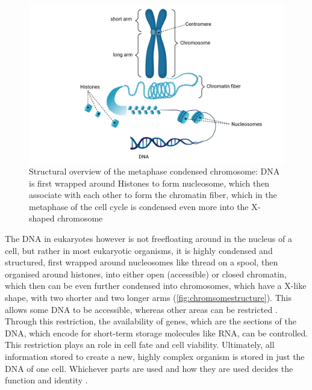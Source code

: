 \begin{figure}[!ht]
\centering
\includegraphics[width=0.9\linewidth]{Figures/intro/ChromosomeStructure}
\caption[Overview Chromosome structure]{Structural overview of the metaphase condensed chromosome: DNA is first wrapped around Histones to form nucleosome, which then associate with each other to form the chromatin fiber, which in the metaphase of the cell cycle is condensed even more into the X-shaped chromosome}\label{fig:chromsomestructure}
\end{figure}

The DNA in eukaryotes\add{,} however is not free\add{-}floating around in the nucleus of a cell, but rather in most eukaryotic organisms, it is highly condensed and structured, first wrapped around nucleosomes like thread on a spool, then organised around histones, into either open (accessible) or closed chromatin, which then can be even further condensed into chromosomes, which have a X-like shape, with two shorter and two longer arms (\autoref{fig:chromsomestructure}). This  allows some DNA to be accessible, whereas other areas can be restricted \cite{Hammond2017}. Through this restriction, the availability of  genes, which are the sections of the DNA, which encode for short-term storage molecules like RNA, can be controlled. This restriction plays an  role in cell fate and cell viability. Ultimately, all information stored to create a new, highly complex organism is stored in just the DNA of one cell. Whichever parts are used and how they are used decides the  function and identity  \cite{Bonev2016}. 


